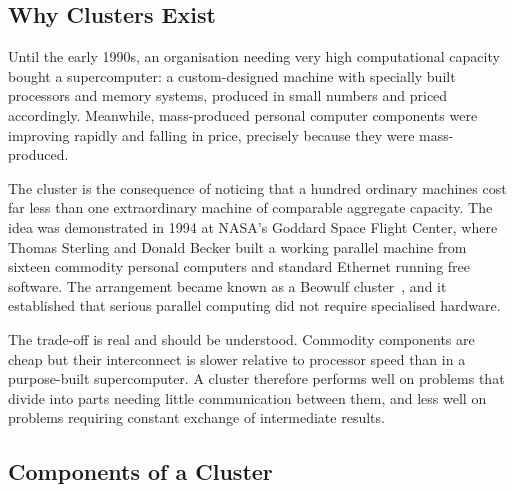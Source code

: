 \subsection{Why Clusters Exist}

Until the early 1990s, an organisation needing very high computational
capacity bought a supercomputer: a custom-designed machine with specially
built processors and memory systems, produced in small numbers and priced
accordingly. Meanwhile, mass-produced personal computer components were
improving rapidly and falling in price, precisely because they were
mass-produced.

The cluster is the consequence of noticing that a hundred ordinary machines
cost far less than one extraordinary machine of comparable aggregate
capacity. The idea was demonstrated in 1994 at NASA's Goddard Space Flight
Center, where Thomas Sterling and Donald Becker built a working parallel
machine from sixteen commodity personal computers and standard Ethernet
running free software. The arrangement became known as a Beowulf
cluster~, and it established that serious parallel computing did not require
specialised hardware.

The trade-off is real and should be understood. Commodity components are
cheap but their interconnect is slower relative to processor speed than in a
purpose-built supercomputer. A cluster therefore performs well on problems
that divide into parts needing little communication between them, and less
well on problems requiring constant exchange of intermediate results.

\subsection{Components of a Cluster}

